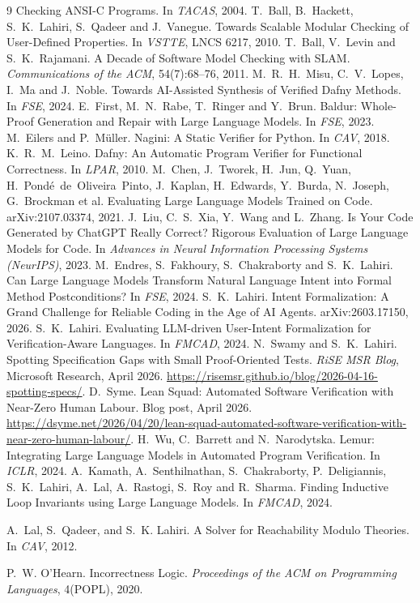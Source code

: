 \documentclass[11pt,letterpaper]{article}
\begin{document}
\begin{thebibliography}{9}
  Checking ANSI-C Programs. In \emph{TACAS}, 2004.
 T.~Ball, B.~Hackett, S.~K.~Lahiri, S.~Qadeer and
  J.~Vanegue. Towards Scalable Modular Checking of User-Defined Properties. In
  \emph{VSTTE}, LNCS 6217, 2010.
 T.~Ball, V.~Levin and S.~K.~Rajamani. A Decade of
  Software Model Checking with SLAM. \emph{Communications of the ACM},
  54(7):68--76, 2011.
 M.~R.~H.~Misu, C.~V.~Lopes, I.~Ma and J.~Noble. Towards
  AI-Assisted Synthesis of Verified Dafny Methods. In \emph{FSE}, 2024.
 E.~First, M.~N.~Rabe, T.~Ringer and Y.~Brun. Baldur:
  Whole-Proof Generation and Repair with Large Language Models. In \emph{FSE},
  2023.
 M.~Eilers and P.~M\"uller. Nagini: A Static Verifier
  for Python. In \emph{CAV}, 2018.
 K.~R.~M.~Leino. Dafny: An Automatic Program Verifier for
  Functional Correctness. In \emph{LPAR}, 2010.
 M.~Chen, J.~Tworek, H.~Jun, Q.~Yuan,
  H.~Pond\'e~de~Oliveira~Pinto, J.~Kaplan, H.~Edwards, Y.~Burda, N.~Joseph,
  G.~Brockman et al. Evaluating Large Language Models
  Trained on Code. arXiv:2107.03374, 2021.
 J.~Liu, C.~S.~Xia, Y.~Wang and L.~Zhang. Is Your Code
  Generated by ChatGPT Really Correct? Rigorous Evaluation of Large Language
  Models for Code. In \emph{Advances in Neural Information Processing Systems
  (NeurIPS)}, 2023.
 M.~Endres, S.~Fakhoury, S.~Chakraborty and
  S.~K.~Lahiri. Can Large Language Models Transform Natural Language Intent into
  Formal Method Postconditions? In \emph{FSE}, 2024.
 S.~K.~Lahiri. Intent Formalization: A Grand Challenge
  for Reliable Coding in the Age of AI Agents. arXiv:2603.17150, 2026.
 S.~K.~Lahiri. Evaluating LLM-driven User-Intent
  Formalization for Verification-Aware Languages. In \emph{FMCAD}, 2024.
 N.~Swamy and S.~K.~Lahiri. Spotting Specification Gaps
  with Small Proof-Oriented Tests. \emph{RiSE MSR Blog}, Microsoft Research,
  April 2026. \url{https://risemsr.github.io/blog/2026-04-16-spotting-specs/}.
 D.~Syme. Lean Squad: Automated Software
  Verification with Near-Zero Human Labour. Blog post, April 2026.
  \url{https://dsyme.net/2026/04/20/lean-squad-automated-software-verification-with-near-zero-human-labour/}.
 H.~Wu, C.~Barrett and N.~Narodytska. Lemur: Integrating
  Large Language Models in Automated Program Verification. In \emph{ICLR},
  2024.
 A.~Kamath, A.~Senthilnathan, S.~Chakraborty,
  P.~Deligiannis, S.~K.~Lahiri, A.~Lal, A.~Rastogi, S.~Roy and R.~Sharma.
  Finding Inductive Loop Invariants using Large Language Models. In
  \emph{FMCAD}, 2024.

  A.~Lal, S.~Qadeer, and S.~K. Lahiri.
  A Solver for Reachability Modulo Theories. In \emph{CAV}, 2012.

  P.~W. O'Hearn.
  Incorrectness Logic. \emph{Proceedings of the ACM on Programming Languages},
  4(POPL), 2020.
\end{thebibliography}
\end{document}
